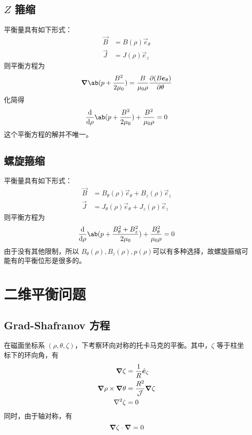 \subsection{\texorpdfstring{$Z$}{Z} 箍缩}

平衡量具有如下形式：
\begin{subequations}\begin{align}
\vec{B} &= B(\rho) \vec{e}_\theta \\
\vec{J} &= J(\rho) \vec{e}_z
\end{align}\end{subequations}
则平衡方程为
\begin{equation}
\grad{\ab( p + \frac{B^2}{2 \mu_0} )}
= \frac{B}{\mu_0 \rho} \pdv{(B \vec{e}_\theta)}{\theta}
\end{equation}
化简得
\begin{equation}
\odv{}{\rho} \ab( p + \frac{B^2}{2 \mu_0} )
+ \frac{B^2}{\mu_0 \rho} = 0
\end{equation}
这个平衡方程的解并不唯一。

\subsection{螺旋箍缩}

平衡量具有如下形式：
\begin{subequations}\begin{align}
\vec{B} &= B_\theta(\rho) \vec{e}_\theta + B_z(\rho) \vec{e}_z \\
\vec{J} &= J_\theta(\rho) \vec{e}_\theta + J_z(\rho) \vec{e}_z
\end{align}\end{subequations}
则平衡方程为
\begin{equation}
\odv{}{\rho} \ab( p + \frac{B_\theta^2 + B_z^2}{2 \mu_0} )
+ \frac{B_\theta^2}{\mu_0 \rho} = 0
\end{equation}
由于没有其他限制，所以 $B_\theta(\rho), B_z(\rho), p(\rho)$可以有多种选择，故螺旋箍缩可能有的平衡位形是很多的。

\section{二维平衡问题}

\subsection{Grad-Shafranov 方程}

在磁面坐标系 $(\rho, \theta, \zeta)$，下考察环向对称的托卡马克的平衡。其中，$\zeta$ 等于柱坐标下的环向角，有
\begin{subequations}\begin{align}
\bm{\nabla}{\zeta} &= \frac{1}{R} \hat{\bm{e}}_\zeta \\
\bm{\nabla}{\rho} \times \bm{\nabla}{\theta} &= \frac{R^2}{\mathcal{J}} \bm{\nabla}{\zeta} \\
\nabla^2{\zeta} &= 0
\end{align}\end{subequations}
同时，由于轴对称，有
\begin{equation}
\bm{\nabla}{\zeta} \cdot \bm{\nabla}{} = 0
\end{equation}

